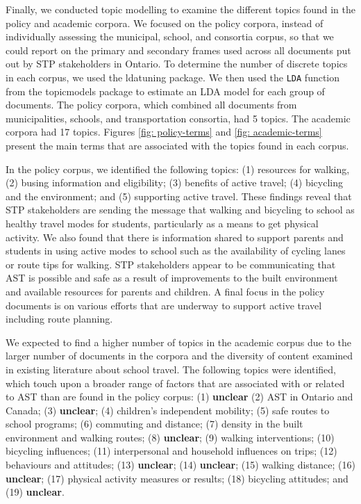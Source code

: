 \documentclass[]{elsarticle} %
\begin{document}
Finally, we conducted topic modelling to examine the different topics
found in the policy and academic corpora. We focused on the policy
corpora, instead of individually assessing the municipal, school, and
consortia corpus, so that we could report on the primary and secondary
frames used across all documents put out by STP stakeholders in Ontario.
To determine the number of discrete topics in each corpus, we used the
ldatuning package. We then used the \texttt{LDA} function from the
topicmodels package to estimate an LDA model for each group of
documents. The policy corpora, which combined all documents from
municipalities, schools, and transportation consortia, had 5 topics. The
academic corpora had 17 topics. Figures \ref{fig: policy-terms} and
\ref{fig: academic-terms} present the main terms that are associated
with the topics found in each corpus.

In the policy corpus, we identified the following topics: (1) resources
for walking, (2) busing information and eligibility; (3) benefits of
active travel; (4) bicycling and the environment; and (5) supporting
active travel. These findings reveal that STP stakeholders are sending
the message that walking and bicycling to school as healthy travel modes
for students, particularly as a means to get physical activity. We also
found that there is information shared to support parents and students
in using active modes to school such as the availability of cycling
lanes or route tips for walking. STP stakeholders appear to be
communicating that AST is possible and safe as a result of improvements
to the built environment and available resources for parents and
children. A final focus in the policy documents is on various efforts
that are underway to support active travel including route planning.

We expected to find a higher number of topics in the academic corpus due
to the larger number of documents in the corpora and the diversity of
content examined in existing literature about school travel. The
following topics were identified, which touch upon a broader range of
factors that are associated with or related to AST than are found in the
policy corpus: (1) \textbf{unclear} (2) AST in Ontario and Canada; (3)
\textbf{unclear}; (4) children's independent mobility; (5) safe routes
to school programs; (6) commuting and distance; (7) density in the built
environment and walking routes; (8) \textbf{unclear}; (9) walking
interventions; (10) bicycling influences; (11) interpersonal and
household influences on trips; (12) behaviours and attitudes; (13)
\textbf{unclear}; (14) \textbf{unclear}; (15) walking distance; (16)
\textbf{unclear}; (17) physical activity measures or results; (18)
bicycling attitudes; and (19) \textbf{unclear}.
\end{document}
